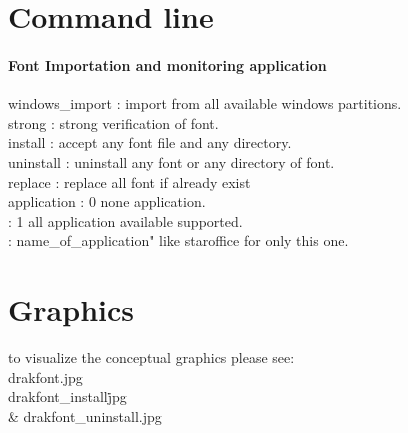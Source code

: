 \documentclass[onecolumn,11pt,oneside]{article}%
\begin{document}
\section{Command line}
\paragraph{Font Importation and monitoring application\\}
\-\-windows\_import : import from all available windows partitions. \\
\-\-strong         : strong verification of font.\\
\-\-install        : accept any font file and any directory.\\
\-\-uninstall      : uninstall any font or any directory of font.\\
\-\-replace        : replace all font if already exist\\
\-\-application    : 0 none application.\\
                 : 1 all application available supported.\\
                 : name\_of\_application" like  staroffice for only this one.\\
				      
\section{Graphics}

to visualize the conceptual graphics please see:\\
drakfont.jpg\\
drakfont\_install\.jpg\\
\& drakfont\_uninstall.jpg\\





\end{document}
